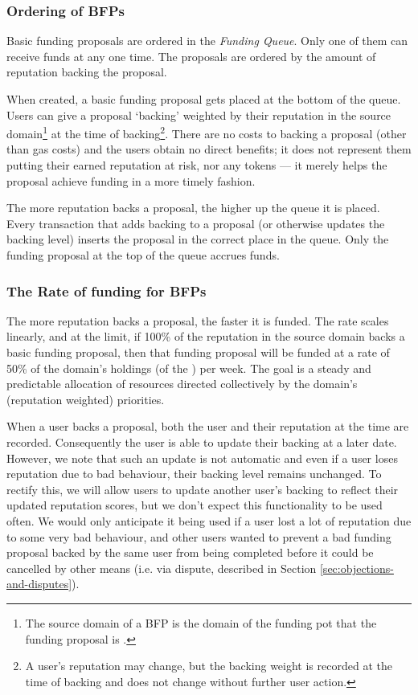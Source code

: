 \subsubsection{Ordering of BFPs}
Basic funding proposals are ordered in the \emph{Funding Queue}. Only one of them can receive funds at any one time. The proposals are ordered by the amount of reputation backing the proposal.

When created, a basic funding proposal gets placed at the bottom of the queue. Users can give a proposal `backing' weighted by their reputation in the source domain\footnote{The source domain of a BFP is the domain of the funding pot that the funding proposal is .} at the time of backing\footnote{A user's reputation may change, but the backing weight is recorded at the time of backing and does not change without further user action.}. There are no costs to backing a proposal (other than gas costs) and the users obtain no direct benefits; it does not represent them putting their earned reputation at risk, nor any tokens --- it merely helps the proposal achieve funding in a more timely fashion.

The more reputation backs a proposal, the higher up the queue it is placed. Every transaction that adds backing to a proposal (or otherwise updates the backing level) inserts the proposal in the correct place in the queue. Only the funding proposal at the top of the queue accrues funds.

\subsubsection{The Rate of funding for BFPs}
The more reputation backs a proposal, the faster it is funded. The rate scales linearly, and at the limit, if 100\% of the reputation in the source domain backs a basic funding proposal, then that funding proposal will be funded at a rate of 50\% of the domain's holdings (of the ) per week. The goal is a steady and predictable allocation of resources directed collectively by the domain's (reputation weighted) priorities.

When a user backs a proposal, both the user and their reputation at the time are recorded. Consequently the user is able to update their backing at a later date. However, we note that such an update is not automatic and even if a user loses reputation due to bad behaviour, their backing level remains unchanged. To rectify this, we will allow users to update another user's backing to reflect their updated reputation scores, but we don't expect this functionality to be used often. We would only anticipate it being used if a user lost a lot of reputation due to some very bad behaviour, and other users wanted to prevent a bad funding proposal backed by the same user from being completed before it could be cancelled by other means (i.e. via dispute, described in Section \ref{sec:objections-and-disputes}).

